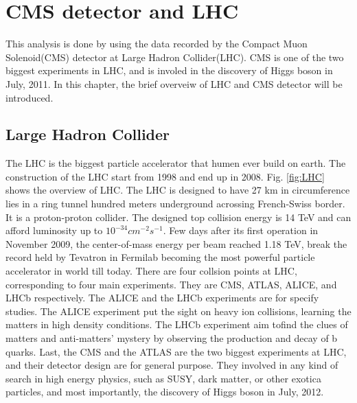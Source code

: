 \chapter{CMS detector and LHC}
This analysis is done by using the data recorded by the Compact Muon Solenoid(CMS) detector at Large Hadron Collider(LHC). CMS is one of the two biggest experiments in LHC, and is involed in the discovery of Higgs boson in July, 2011. In this chapter, the brief overveiw of LHC and CMS detector will be introduced.

\section{Large Hadron Collider} 
The LHC is the biggest particle accelerator that humen ever build on earth. The construction of the LHC start from 1998 and end up in 2008. Fig. \ref{fig:LHC} shows the overview of LHC. The LHC is designed to have 27 km in circumference lies in a ring tunnel hundred meters underground acrossing French-Swiss border. It is a proton-proton collider. The designed top collision energy is 14 TeV and can afford luminosity up to $10^{-34} cm^{-2}s^{-1}$. Few days after its first operation in November 2009, the center-of-mass energy per beam reached 1.18 TeV, break the record held by Tevatron in Fermilab becoming the most powerful particle accelerator in world till today.     
\newline There are four collsion points at LHC, corresponding to four main experiments. They are CMS, ATLAS, ALICE, and LHCb respectively. The ALICE and the LHCb experiments are for specify studies. The ALICE experiment put the sight on heavy ion collisions, learning the matters in high density conditions. The LHCb experiment aim tofind the clues of matters and anti-matters' mystery by observing the production and decay of b quarks. Last, the CMS and the ATLAS are the two biggest experiments at LHC, and their detector design are for general purpose. They involved in any kind of search in high energy physics, such as SUSY, dark matter, or other exotica particles, and most importantly, the discovery of Higgs boson in July, 2012.  

